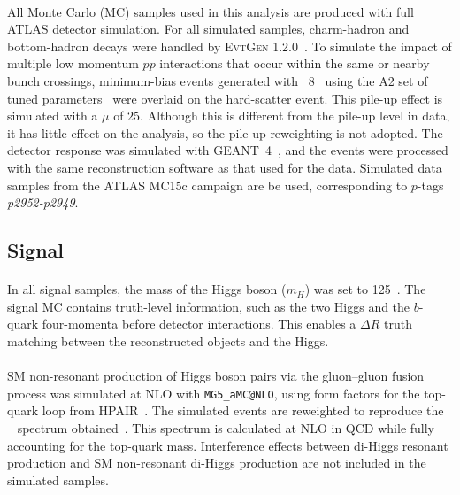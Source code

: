 \paragraph{}
All Monte Carlo (MC) samples used in this analysis are produced with full ATLAS detector simulation.
For all simulated samples, charm-hadron and bottom-hadron decays were handled by {\textsc{EvtGen}} 1.2.0~\cite{EvtGen}.
To simulate the impact of multiple low momentum $pp$ interactions that occur within the same or nearby bunch crossings, minimum-bias events generated with \pythia~8~\cite{Sjostrand:2006za} using the A2 set of tuned parameters~\cite{MC12AU2} were overlaid on the hard-scatter event.
This pile-up effect is simulated with a $\mu$ of $25$.
Although this is different from the pile-up level in data, it has little effect on the analysis, so the pile-up reweighting is not adopted.
The detector response was simulated with GEANT~4~\cite{Agostinelli:2002hh, Aad:2010ah}, and the events were processed with the same reconstruction software as that used for the data.  
Simulated data samples from the ATLAS MC15c campaign are be used, corresponding to $p$-tags \textit{p2952-p2949}.

\subsection{Signal}
\label{sec:MC-sig}
\paragraph{}
In all signal samples, the mass of the Higgs boson ($m_H$) was set to 125~\GeV. 
The signal MC contains truth-level information, such as the two Higgs and the $b$-quark four-momenta before detector interactions. 
This enables a $\Delta R$ truth matching between the reconstructed objects and the Higgs.

\paragraph{}
SM non-resonant production of Higgs boson pairs via the gluon--gluon fusion process was simulated at NLO with \texttt{MG5\_\-aMC\-@NLO}, using form factors for the top-quark loop from HPAIR~\cite{PhysRevD.58.115012, Plehn199646}.
The simulated events are reweighted to reproduce the \mhh~ spectrum obtained~\cite{Borowka:2016ehy, Borowka:2016ypz}. 
This spectrum is calculated at NLO in QCD while fully accounting for the top-quark mass. 
Interference effects between di-Higgs resonant production and SM non-resonant di-Higgs production are not included in the simulated samples. 

